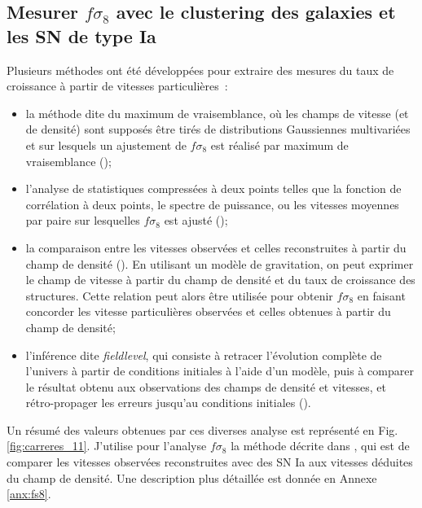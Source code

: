 \documentclass{book}
\begin{document}
\subsection{Mesurer $f\sigma_8$ avec le clustering des galaxies et les SN de type Ia}
\label{sec:art}
 Plusieurs méthodes ont été développées pour extraire des mesures du taux de croissance à partir de vitesses particulières~:
 \begin{itemize}
     \item la méthode dite du maximum de vraisemblance, où les champs de vitesse (et de densité) sont supposés être tirés de distributions Gaussiennes multivariées et sur lesquels un ajustement de $f\sigma_8$ est réalisé par maximum de vraisemblance (\cite{johnson_6df_2014, huterer_testing_2017, howlett_2mtf_2017, adams_joint_2020, lai_using_2022, carreres_growth-rate_2023});
     \item l'analyse de statistiques compressées à deux points telles que la fonction de corrélation à deux points, le spectre de puissance, ou les vitesses moyennes par paire sur lesquelles $f\sigma_8$ est ajusté (\cite{nusser_velocity-density_2017, dupuy_estimation_2019, qin_redshift_2019, turner_local_2023});
     \item la comparaison entre les vitesses observées et celles reconstruites à partir du champ de densité (\cite{davis_effect_2011, carrick_cosmological_2015, boruah_cosmic_2020, said_joint_2020, stahl_peculiar-velocity_2021}). En utilisant un modèle de gravitation, on peut exprimer le champ de vitesse à partir du champ de densité et du taux de croissance des structures. Cette relation peut alors être utilisée pour obtenir $f\sigma_8$ en faisant concorder les vitesse particulières observées et celles obtenues à partir du champ de densité;
     \item l'inférence dite \textit{fieldlevel}, qui consiste à retracer l'évolution complète de l'univers à partir de conditions initiales à l'aide d'un modèle, puis à comparer le résultat obtenu aux observations des champs de densité et vitesses, et rétro-propager les erreurs jusqu'au conditions initiales (\cite{boruah_bayesian_2022, prideaux-ghee_field-based_2023}). 
\end{itemize}

Un résumé des valeurs obtenues par ces diverses analyse est représenté en Fig. \ref{fig:carreres_11}. J'utilise pour l'analyse $f\sigma_8$ la méthode décrite dans \cite{boruah_cosmic_2020,stahl_peculiar-velocity_2021}, qui est de comparer les vitesses observées reconstruites avec des SN Ia aux vitesses déduites du champ de densité. Une description plus détaillée est donnée en Annexe \ref{anx:fs8}.
\end{document}
